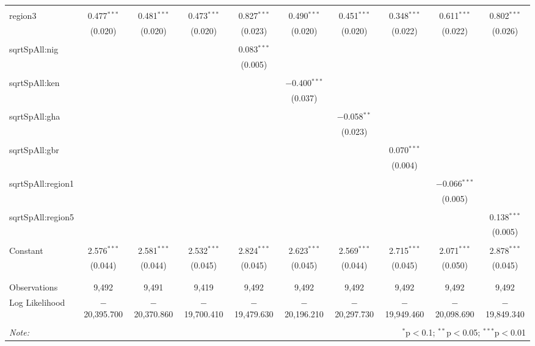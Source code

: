 \begin{table}[!htbp]
\begin{tabular}{@{\extracolsep{5pt}}lccccccccc}
  & & & & & & & & & \\ 
 region3 & 0.477$^{***}$ & 0.481$^{***}$ & 0.473$^{***}$ & 0.827$^{***}$ & 0.490$^{***}$ & 0.451$^{***}$ & 0.348$^{***}$ & 0.611$^{***}$ & 0.802$^{***}$ \\ 
  & (0.020) & (0.020) & (0.020) & (0.023) & (0.020) & (0.020) & (0.022) & (0.022) & (0.026) \\ 
  & & & & & & & & & \\ 
 sqrtSpAll:nig &  &  &  & 0.083$^{***}$ &  &  &  &  &  \\ 
  &  &  &  & (0.005) &  &  &  &  &  \\ 
  & & & & & & & & & \\ 
 sqrtSpAll:ken &  &  &  &  & $-$0.400$^{***}$ &  &  &  &  \\ 
  &  &  &  &  & (0.037) &  &  &  &  \\ 
  & & & & & & & & & \\ 
 sqrtSpAll:gha &  &  &  &  &  & $-$0.058$^{**}$ &  &  &  \\ 
  &  &  &  &  &  & (0.023) &  &  &  \\ 
  & & & & & & & & & \\ 
 sqrtSpAll:gbr &  &  &  &  &  &  & 0.070$^{***}$ &  &  \\ 
  &  &  &  &  &  &  & (0.004) &  &  \\ 
  & & & & & & & & & \\ 
 sqrtSpAll:region1 &  &  &  &  &  &  &  & $-$0.066$^{***}$ &  \\ 
  &  &  &  &  &  &  &  & (0.005) &  \\ 
  & & & & & & & & & \\ 
 sqrtSpAll:region5 &  &  &  &  &  &  &  &  & 0.138$^{***}$ \\ 
  &  &  &  &  &  &  &  &  & (0.005) \\ 
  & & & & & & & & & \\ 
 Constant & 2.576$^{***}$ & 2.581$^{***}$ & 2.532$^{***}$ & 2.824$^{***}$ & 2.623$^{***}$ & 2.569$^{***}$ & 2.715$^{***}$ & 2.071$^{***}$ & 2.878$^{***}$ \\ 
  & (0.044) & (0.044) & (0.045) & (0.045) & (0.045) & (0.044) & (0.045) & (0.050) & (0.045) \\ 
  & & & & & & & & & \\ 
\hline \\[-1.8ex] 
Observations & 9,492 & 9,491 & 9,419 & 9,492 & 9,492 & 9,492 & 9,492 & 9,492 & 9,492 \\ 
Log Likelihood & $-$20,395.700 & $-$20,370.860 & $-$19,700.410 & $-$19,479.630 & $-$20,196.210 & $-$20,297.730 & $-$19,949.460 & $-$20,098.690 & $-$19,849.340 \\ 
\hline 
\hline \\[-1.8ex] 
\textit{Note:}  & \multicolumn{9}{r}{$^{*}$p$<$0.1; $^{**}$p$<$0.05; $^{***}$p$<$0.01} \\ 
\end{tabular} 
\end{table} 
